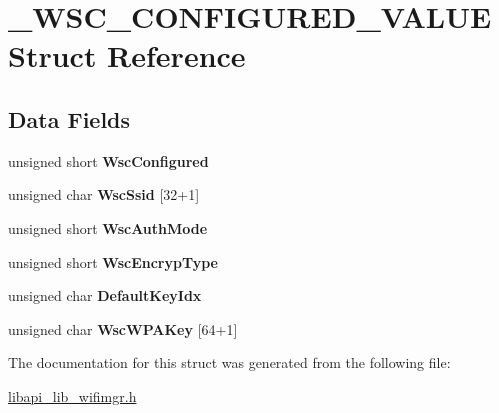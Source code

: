 \hypertarget{struct__WSC__CONFIGURED__VALUE}{}\section{\+\_\+\+W\+S\+C\+\_\+\+C\+O\+N\+F\+I\+G\+U\+R\+E\+D\+\_\+\+V\+A\+L\+UE Struct Reference}
\label{struct__WSC__CONFIGURED__VALUE}
\subsection*{Data Fields}
\begin{DoxyCompactItemize}
\item 
\mbox{\label{struct__WSC__CONFIGURED__VALUE_aa14c2cd182350195ab47ebc58180dee7}} 
unsigned short {\bfseries Wsc\+Configured}
\item 
\mbox{\label{struct__WSC__CONFIGURED__VALUE_acf8c04601c590dabd0f7b95e2d691098}} 
unsigned char {\bfseries Wsc\+Ssid} \mbox{[}32+1\mbox{]}
\item 
\mbox{\label{struct__WSC__CONFIGURED__VALUE_a6f1f75108f38ed21f95000738a8524b2}} 
unsigned short {\bfseries Wsc\+Auth\+Mode}
\item 
\mbox{\label{struct__WSC__CONFIGURED__VALUE_a902696d06a7eab3fa48debac2f42b458}} 
unsigned short {\bfseries Wsc\+Encryp\+Type}
\item 
\mbox{\label{struct__WSC__CONFIGURED__VALUE_a088f8fac73264fed02c1691752e279ca}} 
unsigned char {\bfseries Default\+Key\+Idx}
\item 
\mbox{\label{struct__WSC__CONFIGURED__VALUE_a3ccca4acb4ccb05632952f207a70339a}} 
unsigned char {\bfseries Wsc\+W\+P\+A\+Key} \mbox{[}64+1\mbox{]}
\end{DoxyCompactItemize}


The documentation for this struct was generated from the following file\+:\begin{DoxyCompactItemize}
\item 
\hyperlink{libapi__lib__wifimgr_8h}{libapi\+\_\+lib\+\_\+wifimgr.\+h}\end{DoxyCompactItemize}
